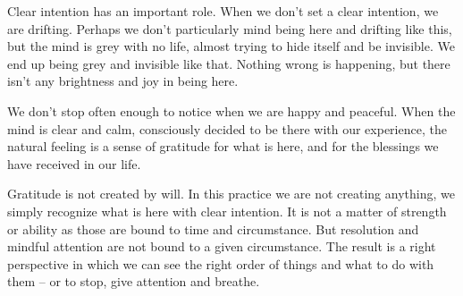 Clear intention has an important role. When we don't set a clear
intention, we are drifting. Perhaps we don't particularly mind being
here and drifting like this, but the mind is grey with no life, almost
trying to hide itself and be invisible. We end up being grey and
invisible like that. Nothing wrong is happening, but there isn't any
brightness and joy in being here.

We don't stop often enough to notice when we are happy and peaceful.
When the mind is clear and calm, consciously decided to be there with
our experience, the natural feeling is a sense of gratitude for what is
here, and for the blessings we have received in our life.

Gratitude is not created by will. In this practice we are not creating
anything, we simply recognize what is here with clear intention. It is
not a matter of strength or ability as those are bound to time and
circumstance. But resolution and mindful attention are not bound to a
given circumstance. The result is a right perspective in which we can
see the right order of things and what to do with them -- or to stop,
give attention and breathe.
